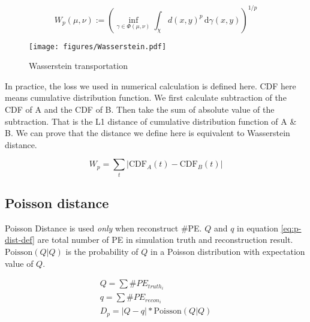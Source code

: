 \label{sub:Wasserstein distance}
    \begin{equation}
        W_{p}(\mu,\nu):=\left(\inf_{\gamma\in\Phi(\mu,\nu)}\int_{\chi}d(x,y)^{p}\,\mathrm{d}\gamma(x,y)\right)^{1/p}
        \label{eq:w-dist-def}
    \end{equation}
    \begin{figure}[H]
        \centering
            \texttt{[image: figures/Wasserstein.pdf]}
        \caption{\label{fig:Wasserstein transportation} Wasserstein transportation}
    \end{figure}

In practice, the loss we used in numerical calculation is defined here. CDF here means cumulative distribution function. We first calculate subtraction of the CDF of A and the CDF of B. Then take the sum of absolute value of the subtraction. That is the L1 distance of cumulative distribution function of A \& B. We can prove that the distance we define here is equivalent to Wasserstein distance. 

\begin{equation}
    W_{p}=\sum_t|\mathrm{CDF}_A(t) - \mathrm{CDF}_B(t)|
\end{equation}

\subsection{Poisson distance}
Poisson Distance is used \emph{only} when reconstruct \#PE. $Q$ and $q$ in equation \eqref{eq:p-dist-def} are total number of PE in simulation truth and reconstruction result. $\mathrm{Poisson}(Q|Q)$ is the probability of $Q$ in a Poisson distribution with expectation value of $Q$. 

\label{sub:Poisson distance}
    \begin{align}
        Q = \sum \#PE_{truth_i} \\
        q = \sum \#PE_{recon_i} \\
        D_{p} = |Q-q|*\mathrm{Poisson}(Q|Q)
        \label{eq:p-dist-def}
    \end{align}

